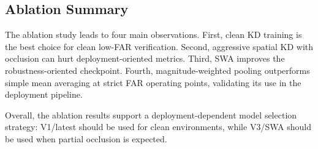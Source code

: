 \subsection{Ablation Summary}

The ablation study leads to four main observations. First, clean KD training is the best choice for clean low-FAR verification. Second, aggressive spatial KD with occlusion can hurt deployment-oriented metrics. Third, SWA improves the robustness-oriented checkpoint. Fourth, magnitude-weighted pooling outperforms simple mean averaging at strict FAR operating points, validating its use in the deployment pipeline.

Overall, the ablation results support a deployment-dependent model selection strategy: V1/latest should be used for clean environments, while V3/SWA should be used when partial occlusion is expected.